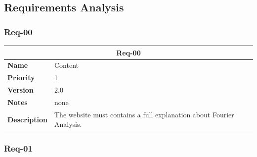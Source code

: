 \documentclass{article}
\begin{document}
\subsection{Requirements Analysis}

\subsubsection{Req-00}

\bgroup{}
\def\arraystretch{1.25}
\begin{center}
    \begin{tabular}{ |l|p{9cm}| }
        \hline
        \multicolumn{2}{|c|}{\textbf{Req-00}} \\
        \hline
        \textbf{Name} & Content \\
        \hline
        \textbf{Priority} & 1 \\
        \hline
        \textbf{Version} & 2.0 \\
        \hline
        \textbf{Notes} & none \\
        \hline
        \textbf{Description}
        & The website must contains a full explanation about Fourier Analysis. \\
        \hline
    \end{tabular}
\end{center}
\egroup{}

\subsubsection{Req-01}
\end{document}
